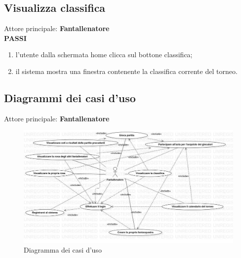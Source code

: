 \documentclass[12pt,a4paper]{article}
\begin{document}
\subsection{Visualizza classifica}
Attore principale: \textbf{Fantallenatore}\\
\newline
\textbf{PASSI}
\begin{enumerate}
\item l'utente dalla schermata home clicca sul bottone classifica;
\item il sistema mostra una finestra contenente la classifica corrente del torneo.
\end{enumerate}
\subsection{Diagrammi dei casi d'uso}
Attore principale: \textbf{Fantallenatore}
\begin{figure}[h]
\centering
\includegraphics[width=15 cm,keepaspectratio]{diagrammaCasiUso.jpg}
\caption{Diagramma dei casi d'uso}
\end{figure}
\end{document}
